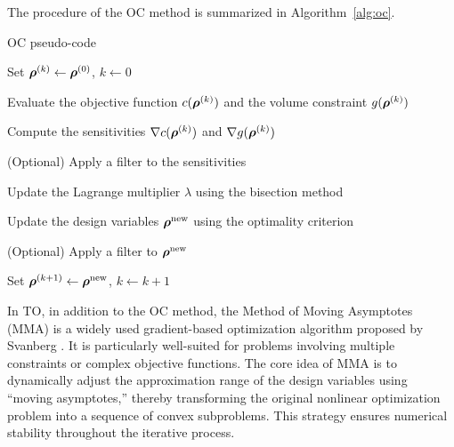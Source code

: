 \documentclass[mathpazo]{cicp}
\begin{document}
The procedure of the OC method is summarized in Algorithm~\ref{alg:oc}.
\vspace{-1ex}
\begin{algorithm}[H]
	\caption{OC pseudo-code}
	\label{alg:oc}
	\begin{minipage}{\textwidth}
		Set $\boldsymbol{\rho}^{(k)} \leftarrow \boldsymbol{\rho}^{(0)}$, $k \leftarrow 0$\;
		
		{
			Evaluate the objective function $c(\boldsymbol{\rho}^{(k)})$ and the volume constraint $g(\boldsymbol{\rho}^{(k)})$\;
			
			Compute the sensitivities $\nabla c(\boldsymbol{\rho}^{(k)})$ and $\nabla g(\boldsymbol{\rho}^{(k)})$\;
			
			(Optional) Apply a filter to the sensitivities\;
			
			Update the Lagrange multiplier $\lambda$ using the bisection method\;
			
			Update the design variables $\boldsymbol{\rho}^{\text{new}}$ using the optimality criterion\;
			
			(Optional) Apply a filter to $\boldsymbol{\rho}^{\text{new}}$\;
			
			Set $\boldsymbol{\rho}^{(k+1)} \leftarrow \boldsymbol{\rho}^{\text{new}}$, $k \leftarrow k + 1$\;
		}
	\end{minipage}
\end{algorithm}
\vspace{-1ex}

In TO, in addition to the OC method, the Method of Moving Asymptotes (MMA) is a widely used gradient-based optimization algorithm proposed by Svanberg \cite{svanberg1987method}. It is particularly well-suited for problems involving multiple constraints or complex objective functions. The core idea of MMA is to dynamically adjust the approximation range of the design variables using “moving asymptotes,” thereby transforming the original nonlinear optimization problem into a sequence of convex subproblems. This strategy ensures numerical stability throughout the iterative process.
\end{document}

